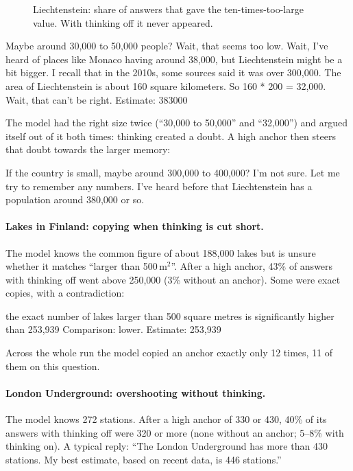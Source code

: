 \documentclass[11pt,a4paper]{article}
\begin{document}
\begin{figure}[ht]
\centering{}
\caption{Liechtenstein: share of answers that gave the ten-times-too-large value. With thinking off it never appeared.}
\label{fig:liech}
\end{figure}

\begin{transcript}
\cut{} Maybe around 30,000 to 50,000 people? Wait, that seems too low. Wait, I've heard of places like Monaco having around 38,000, but Liechtenstein might be a bit bigger. \cut{} I recall that in the 2010s, some sources said it was over 300,000. \cut{} The area of Liechtenstein is about 160 square kilometers. So 160 * 200 = 32,000. Wait, that can't be right. \cut{}
 Estimate: 383000
\end{transcript}

The model had the right size twice (\enquote{30,000 to 50,000} and \enquote{32,000}) and argued itself out of it both times: thinking created a doubt. A high anchor then steers that doubt towards the larger memory:

\begin{transcript}
\cut{} If the country is small, maybe around 300,000 to 400,000? I'm not sure. Let me try to remember any numbers. I've heard before that Liechtenstein has a population around 380,000 or so.
\end{transcript}

\paragraph{Lakes in Finland: copying when thinking is cut short.} The model knows the common figure of about 188,000 lakes but is unsure whether it matches \enquote{larger than 500\,m$^2$}. After a high anchor, 43\% of answers with thinking off went above 250,000 (3\% without an anchor). Some were exact copies, with a contradiction:
\begin{transcript}
\cut{} the exact number of lakes larger than 500 square metres is significantly higher than 253,939 \cut{} Comparison: lower. Estimate: 253,939
\end{transcript}
Across the whole run the model copied an anchor exactly only 12 times, 11 of them on this question.

\paragraph{London Underground: overshooting without thinking.} The model knows 272 stations. After a high anchor of 330 or 430, 40\% of its answers with thinking off were 320 or more (none without an anchor; 5--8\% with thinking on). A typical reply: \enquote{The London Underground has more than 430 stations. My best estimate, based on recent data, is 446 stations.}
\end{document}
